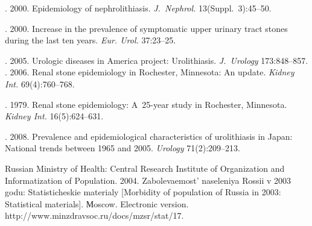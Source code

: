 


\vspace*{3pt}

  \begin{multicols}{2}

\renewcommand{\bibname}{\protect\rmfamily References}

{\small\frenchspacing
{%
\begin{thebibliography}{99}


. 2000. Epidemiology of nephrolithiasis. 
\textit{J.~Nephrol.} 13(Suppl.~3):45--50.

. 2000. 
Increase in the prevalence of symptomatic upper urinary tract stones during the last ten years. 
\textit{Eur. Urol.} 37:23--25.

. 2005. Urologic diseases in America 
project: Urolithiasis. \textit{J.~Urology} 173:848--857. 
. 2006. Renal stone epidemiology in Rochester, Minnesota: An 
update. \textit{Kidney Int.} 69(4):760--768.


. 
1979. Renal stone epidemiology: A~25-year study in Rochester, Minnesota. \textit{Kidney 
Int.} 16(5):624--631.

. 2008. Prevalence and epidemiological 
characteristics of urolithiasis in Japan: National trends between 1965 and 2005. \textit{Urology}  
 71(2):209--213.

Russian Ministry of Health:
Central Research Institute of Organization and Informatization of Population.
2004. Zabolevaemost' naseleniya Rossii v 2003 godu: Sta\-ti\-sti\-che\-skie materialy [Morbidity of 
population of Russia in 2003: Statistical materials]. Мoscow.  Electronic version.
{\sf http://www.minzdravsoc.ru/docs/mzsr/stat/17}.


\end{thebibliography}}}
\end{multicols}
